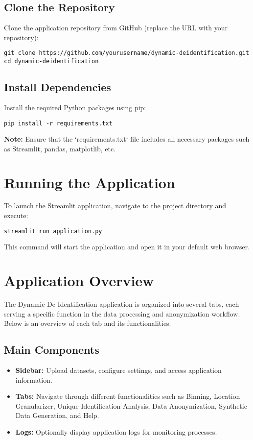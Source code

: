 \documentclass[12pt,a4paper]{article}
\begin{document}
\subsection{Clone the Repository}
Clone the application repository from GitHub (replace the URL with your repository):

\begin{verbatim}
git clone https://github.com/yourusername/dynamic-deidentification.git
cd dynamic-deidentification
\end{verbatim}

\subsection{Install Dependencies}
Install the required Python packages using pip:

\begin{verbatim}
pip install -r requirements.txt
\end{verbatim}

\textbf{Note:} Ensure that the `requirements.txt` file includes all necessary packages such as Streamlit, pandas, matplotlib, etc.


\section{Running the Application}
To launch the Streamlit application, navigate to the project directory and execute:

\begin{verbatim}
streamlit run application.py
\end{verbatim}

This command will start the application and open it in your default web browser.

\section{Application Overview}
The Dynamic De-Identification application is organized into several tabs, each serving a specific function in the data processing and anonymization workflow. Below is an overview of each tab and its functionalities.

\subsection{Main Components}
\begin{itemize}
    \item \textbf{Sidebar:} Upload datasets, configure settings, and access application information.
    \item \textbf{Tabs:} Navigate through different functionalities such as Binning, Location Granularizer, Unique Identification Analysis, Data Anonymization, Synthetic Data Generation, and Help.
    \item \textbf{Logs:} Optionally display application logs for monitoring processes.
\end{itemize}
\end{document}
